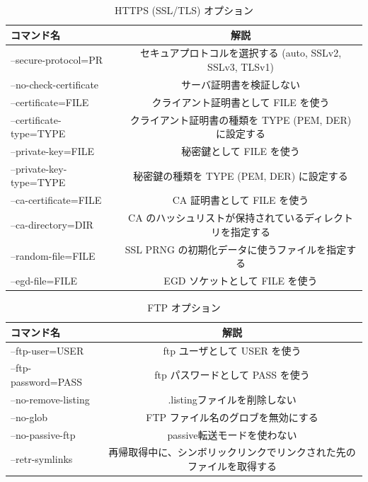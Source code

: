 \begin{table}[H]
  \begin{center}
    \caption{HTTPS (SSL/TLS) オプション}
    \begin{tabular}{|l|c|} \hline
      コマンド名 & 解説  \\ \hline
 --secure-protocol=PR & セキュアプロトコルを選択する (auto, SSLv2, SSLv3, TLSv1) \\
       --no-check-certificate & サーバ証明書を検証しない \\
       --certificate=FILE & クライアント証明書として FILE を使う \\
       --certificate-type=TYPE & クライアント証明書の種類を TYPE (PEM, DER) に設定する \\
       --private-key=FILE & 秘密鍵として FILE を使う \\
       --private-key-type=TYPE & 秘密鍵の種類を TYPE (PEM, DER) に設定する \\
       --ca-certificate=FILE & CA 証明書として FILE を使う \\
       --ca-directory=DIR & CA のハッシュリストが保持されているディレクトリを指定する \\
       --random-file=FILE & SSL PRNG の初期化データに使うファイルを指定する \\
       --egd-file=FILE & EGD ソケットとして FILE を使う \\ \hline
    \end{tabular}
  \end{center}
\end{table}

\begin{table}[H]
  \begin{center}
    \caption{FTP オプション}
    \begin{tabular}{|l|c|} \hline
      コマンド名 & 解説  \\ \hline
 --ftp-user=USER & ftp ユーザとして USER を使う \\
       --ftp-password=PASS & ftp パスワードとして PASS を使う \\
       --no-remove-listing & .listingファイルを削除しない \\
       --no-glob & FTP ファイル名のグロブを無効にする \\
       --no-passive-ftp & passive転送モードを使わない \\
       --retr-symlinks & 再帰取得中に、シンボリックリンクでリンクされた先のファイルを取得する \\ \hline
    \end{tabular}
  \end{center}
\end{table}

